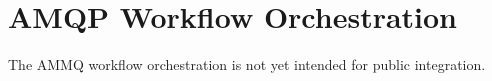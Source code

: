 \chapter{AMQP Workflow Orchestration}\label{sec:amqp-workflow-orch}

The AMMQ workflow orchestration is not yet intended for public integration.


